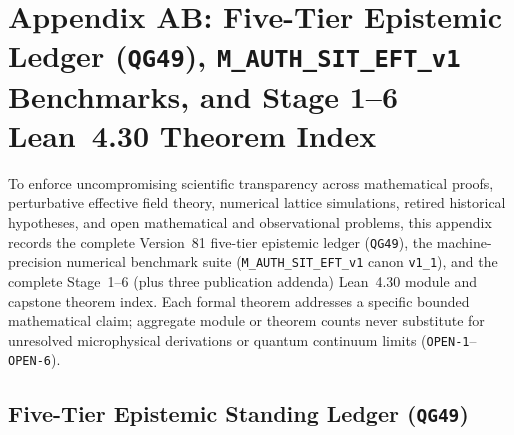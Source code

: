 \setcounter{subsection}{0}
\renewcommand{\thesection}{AB}
\renewcommand{\thesubsection}{AB.\arabic{subsection}}
\section*{Appendix AB: Five-Tier Epistemic Ledger (\texttt{QG49}), \texttt{M\_AUTH\_SIT\_EFT\_v1} Benchmarks, and Stage 1--6 Lean~4.30 Theorem Index}
\label{app:epistemic-ledger-lean}

To enforce uncompromising scientific transparency across mathematical proofs, perturbative effective field theory, numerical lattice simulations, retired historical hypotheses, and open mathematical and observational problems, this appendix records the complete Version~81 five-tier epistemic ledger (\texttt{QG49}), the machine-precision numerical benchmark suite (\texttt{M\_AUTH\_SIT\_EFT\_v1} canon \texttt{v1\_1}), and the complete Stage~1--6 (plus three publication addenda) Lean~4.30 module and capstone theorem index. Each formal theorem addresses a specific bounded mathematical claim; aggregate module or theorem counts never substitute for unresolved microphysical derivations or quantum continuum limits (\texttt{OPEN-1}--\texttt{OPEN-6}).

\subsection{Five-Tier Epistemic Standing Ledger (\texttt{QG49})}

